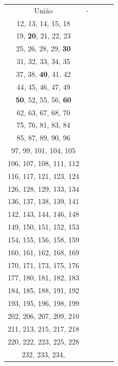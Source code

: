 \documentclass{article}
\begin{document}
\begin{table}[h]
\begin{tabular}{c|c|c|c|c}
União & - & \begin{tabular}[c]{@{}c@{}}\textbf{1}, 4, 7, \textbf{10}, 11\\12, 13, 14, 15, 18\\19, \textbf{20}, 21, 22, 23\\25, 26, 28, 29, \textbf{30}\\31, 32, 33, 34, 35\\37, 38, \textbf{40}, 41, 42\\44, 45, 46, 47, 49\\\textbf{50}, 52, 55, 56, \textbf{60}\\62, 63, 67, 68, 70\\75, 76, 81, 83, 84\\85, 87, 89, 90, 96\\97, 99, 101, 104, 105\\106, 107, 108, 111, 112\\116, 117, 121, 123, 124\\126, 128, 129, 133, 134\\136, 137, 138, 139, 141\\142, 143, 144, 146, 148\\149, 150, 151, 152, 153\\154, 155, 156, 158, 159\\160, 161, 162, 168, 169\\170, 171, 173, 175, 176\\177, 180, 181, 182, 183\\184, 185, 188, 191, 192\\193, 195, 196, 198, 199\\202, 206, 207, 209, 210\\211, 213, 215, 217, 218\\220, 222, 223, 225, 228\\232, 233, 234, 
\end{tabular}
\end{table}
\end{document}
